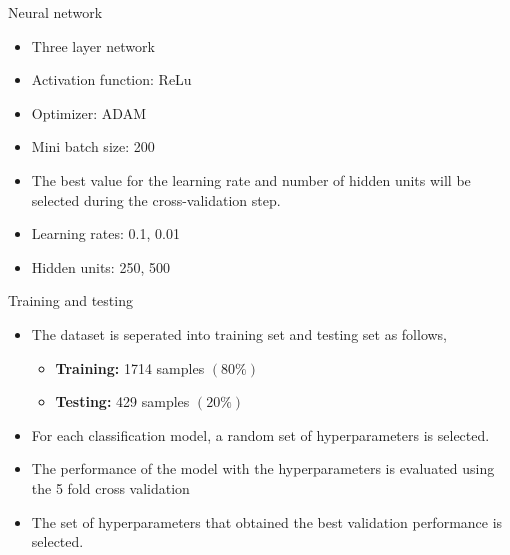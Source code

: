 \documentclass[12pt]{beamer}
\begin{document}
\begin{frame}{Neural network}
    \begin{itemize}
        \item Three layer network
        \item Activation function: ReLu
        \item Optimizer: ADAM
        \item Mini batch size: 200
        \item The best value for the learning rate and number of hidden units will be selected during the cross-validation step.
        \item Learning rates: 0.1, 0.01
        \item Hidden units: 250, 500
    \end{itemize}
\end{frame}

\begin{frame}{Training and testing}
    \begin{itemize}
        \item The dataset is seperated into training set and testing set as follows,
        \begin{itemize}
            \item \textbf{Training:} 1714 samples $(80\%)$
            \item \textbf{Testing:} 429 samples $(20\%)$
        \end{itemize}
        \item For each classification model, a random set of hyperparameters is selected.
        \item The performance of the model with the hyperparameters is evaluated using the 5 fold cross validation
        \item The set of hyperparameters that obtained the best validation performance is selected.
    \end{itemize}
\end{frame}
\end{document}
